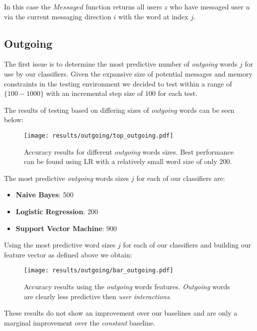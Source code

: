 In this case the $Messaged$ function returns all users $z$ who have messaged user $u$ via the current messaging direction $i$ with the
word at index $j$.

\subsection{Outgoing}
\label{sec:id}

The first issue is to determine the most predictive number of \emph{outgoing} words $j$ for use by our classifiers. 
Given the expansive size of potential messages and memory constraints in the testing environment we decided to test within a range 
of $\{100-1000\}$ with an incremental step size of $100$ for each test.

The results of testing based on differing sizes of \emph{outgoing} words can be seen below:

\begin{figure}[h]
	\begin{center}
		\texttt{[image: results/outgoing/top\_outgoing.pdf]}
		\caption{Accuracy results for different \emph{outgoing} words sizes. Best performance can be found using LR with a relatively small word size of only $200$.}
	\end{center}
\end{figure}

The most predictive \emph{outgoing} words sizes $j$ for each of our classifiers are:
\begin{itemize}
\item \textbf{Naive Bayes}: 500
\item \textbf{Logistic Regression}: 200
\item \textbf{Support Vector Machine}: 900
\end{itemize}

Using the most predictive word sizes $j$ for each of our classifiers and building our feature vector as defined above we obtain:

\begin{figure}[h]
	\begin{center}
		\texttt{[image: results/outgoing/bar\_outgoing.pdf]}
		\caption{Accuracy results using the \emph{outgoing} words features. \emph{Outgoing} words are clearly less predictive then \emph{user interactions}.}
	\end{center}
\end{figure}

These results do not show an improvement over our baselines and are only a marginal improvement over the \emph{constant} baseline. 

